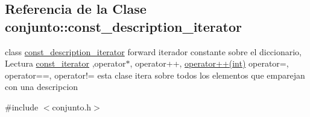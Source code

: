 \hypertarget{classconjunto_1_1const__description__iterator}{\subsection{Referencia de la Clase conjunto\-:\-:const\-\_\-description\-\_\-iterator}
\label{classconjunto_1_1const__description__iterator}
}


class \hyperlink{classconjunto_1_1const__description__iterator}{const\-\_\-description\-\_\-iterator} forward iterador constante sobre el diccionario, Lectura \hyperlink{classconjunto_1_1const__iterator}{const\-\_\-iterator} ,operator$\ast$, operator++, \hyperlink{classconjunto_1_1const__description__iterator_a6e102f59a677e3bf43aec62609531b11}{operator++(int)} operator=, operator==, operator!= esta clase itera sobre todos los elementos que emparejan con una descripcion  




{\ttfamily \#include $<$conjunto.\-h$>$}

